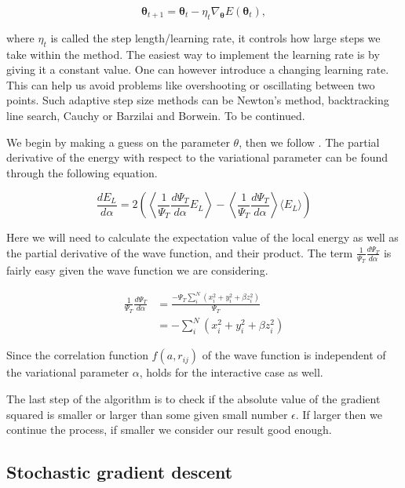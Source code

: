 \begin{equation} \label{eq:theta}
\mathbf{\theta}_{t+1} = \mathbf{\theta}_t - \eta_t \nabla_{\mathbf{\theta}} E(\mathbf{\theta}_t),
\end{equation}

where $\eta_t$ is called the step length/learning rate, it controls how large steps we take within the method.
The easiest way to implement the learning rate is by giving it a constant value. One can however introduce a changing learning rate. This can help us avoid problems like overshooting or oscillating between two points. Such adaptive step size methods can be Newton's method, backtracking line search, Cauchy or Barzilai and Borwein. To be continued. 

We begin by making a guess on the parameter $\theta$, then we follow . The partial derivative of the energy with respect to the variational parameter can be found through the following equation.

\begin{equation}
\frac{dE_L}{d\alpha} = 2 \left( \left\langle \frac{1}{\Psi_T}\frac{d \Psi_T}{d \alpha} E_L \right\rangle  - \left\langle  \frac{1}{\Psi_T}\frac{d \Psi_T}{d \alpha} \right\rangle \langle E_L \rangle \right)
\end{equation}

Here we will need to calculate the expectation value of the local energy as well as the partial derivative of the wave function, and their product. The term $\frac{1}{\Psi_T}\frac{d \Psi_T}{d \alpha}$ is fairly easy given the wave function we are considering. 

\begin{align} 
\frac{1}{\Psi_T}\frac{d \Psi_T}{d \alpha} &= \frac{-\Psi_T \sum_i^N (x_i^2 + y_i^2 + \beta z^2_i)}{\Psi_T} \\
&= -\sum_i^N (x_i^2 + y_i^2 + \beta z^2_i) \label{eq:frac_deri_wf}
\end{align}

Since the correlation function $f(a, r_{ij})$ of the wave function is independent of the variational parameter $\alpha$,  holds for the interactive case as well.

The last step of the algorithm is to check if the absolute value of the gradient squared is smaller or larger than some given small number $\epsilon$. If larger then we continue the process, if smaller we consider our result good enough. 

\subsection{Stochastic gradient descent}

